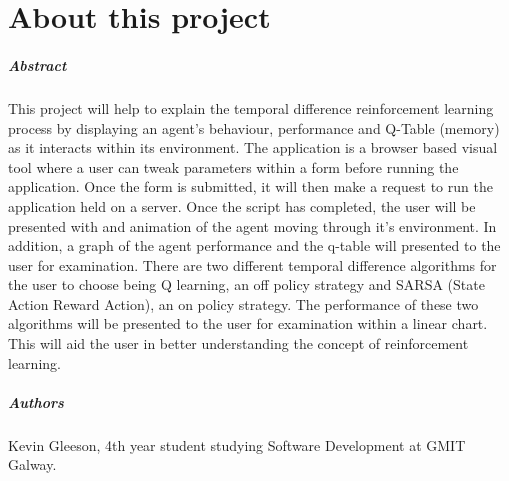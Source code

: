 
\chapter*{About this project}
\paragraph{Abstract}

This project will help to explain the temporal difference reinforcement learning process by displaying an agent's behaviour, performance and Q-Table (memory) as it interacts within its environment. The application is a browser based visual tool where a user can tweak parameters within a form before running the application. Once the form is submitted, it will then make a request to run the application held on a server. Once the script has completed, the user will be presented with and animation of the agent moving through it's environment. In addition, a graph of the agent performance and the q-table will presented to the user for examination. There are two different temporal difference algorithms for the user to choose being Q learning, an off policy strategy and SARSA (State Action Reward Action), an on policy strategy. The performance of these two algorithms will be presented to the user for examination within a linear chart.
This will aid the user in better understanding the concept of reinforcement learning.

\paragraph{Authors}
Kevin Gleeson, 4th year student studying Software Development at GMIT Galway.



